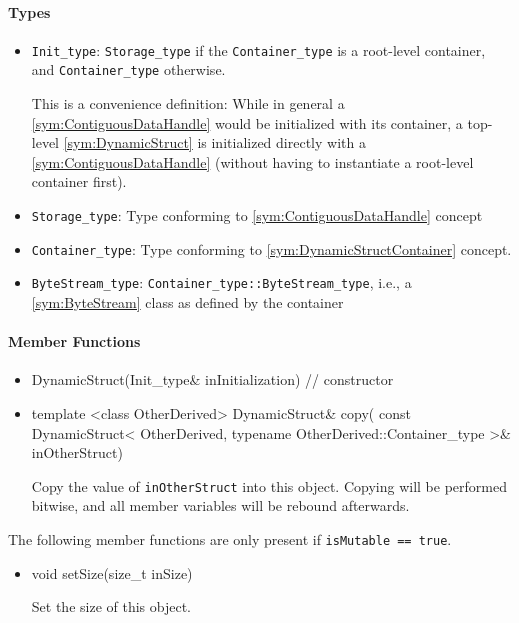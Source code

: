 \paragraph{Types}

\begin{itemize}
	\item \texttt{Init\_type}: \texttt{Storage\_type} if the \texttt{Container\_type} is a root-level container, and \texttt{Container\_type} otherwise.
	
	This is a convenience definition: While in general a \ref{sym:ContiguousDataHandle} would be initialized with its container, a top-level \ref{sym:DynamicStruct} is initialized directly with a \ref{sym:ContiguousDataHandle} (without having to instantiate a root-level container first).
	
	\item \texttt{Storage\_type}: Type conforming to \ref{sym:ContiguousDataHandle} concept
	\item \texttt{Container\_type}: Type conforming to \ref{sym:DynamicStructContainer} concept.
	\item \texttt{ByteStream\_type}: \texttt{Container\_type::ByteStream\_type}, i.e., a \ref{sym:ByteStream} class as defined by the container
\end{itemize}

\paragraph{Member Functions}

\begin{itemize}
	\item
		\begin{cppsnippet}
		DynamicStruct(Init_type& inInitialization) // constructor
		\end{cppsnippet}
		
	\item
		\begin{cppsnippet}
		template <class OtherDerived>
		DynamicStruct& copy(
		    const DynamicStruct<
		        OtherDerived,
		        typename OtherDerived::Container_type
		    >& inOtherStruct)
		\end{cppsnippet}
		
		Copy the value of \texttt{inOtherStruct} into this object. Copying will be performed bitwise, and all member variables will be rebound afterwards.
\end{itemize}

The following member functions are only present if \texttt{isMutable == true}.
\begin{itemize}
	\item
		\begin{cppsnippet}
		void setSize(size_t inSize)
		\end{cppsnippet}
		
		Set the size of this object.
\end{itemize}

